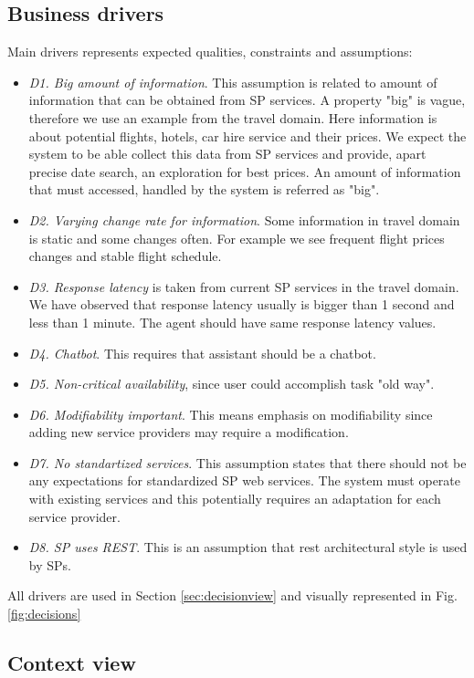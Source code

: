 \documentclass{llncs}
\begin{document}
\subsection{Business drivers}
\label{sec:social-context}
Main drivers represents expected qualities, constraints and assumptions: 
\begin{itemize}
	\item \emph{D1. Big amount of information}. This assumption is related to amount of information that can be obtained from \gls{SP} services. A property "big" is vague, therefore we use an example from the travel domain. Here information is about potential flights, hotels, car hire service and their prices. We expect the system to be able collect this data from \gls{SP} services and provide, apart precise date search, an exploration for best prices. An amount of information that must accessed, handled by the system is referred as "big".
	\item \emph{D2. Varying change rate for information}. Some information in travel domain is static and some changes often. For example we see frequent flight prices changes and stable flight schedule.
	\item \emph{D3. Response latency} is taken from current \gls{SP} services in the travel domain. We have observed that response latency usually is bigger than 1 second and less than 1 minute. The agent should have same response latency values.
	\item \emph{D4. Chatbot}. This requires that assistant should be a chatbot.
	\item \emph{D5. Non-critical availability}, since user could accomplish task "old way".
	\item \emph{D6. Modifiability important}. This means emphasis on modifiability since adding new service providers may require a modification.	
	\item \emph{D7. No standartized services}. This assumption states that there should not be any expectations for standardized \gls{SP} web services. The system must operate with existing services and this potentially requires an adaptation for each service provider.
	\item \emph{D8. SP uses REST}. This is an assumption that \gls{rest} architectural style \cite{fielding2000architectural} is used by \gls{SP}s.
\end{itemize}
All drivers are used in Section \ref{sec:decisionview} and visually represented in Fig. \ref{fig:decisions}

\subsection{Context view}
\label{sec:context-view}
\end{document}
